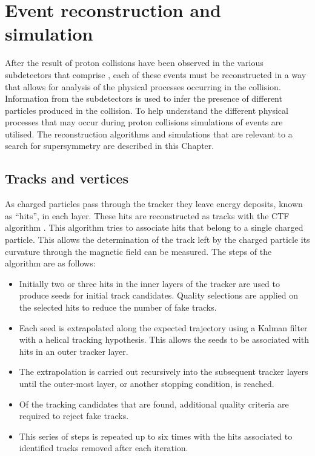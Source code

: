 \chapter{Event reconstruction and simulation}
\label{chap:reconstruction}

After the result of proton collisions have been observed in the
various subdetectors that comprise \CMS, each of these events must be
reconstructed in a way that allows for analysis of the physical
processes occurring in the collision. Information from the
subdetectors is used to infer the presence of different particles
produced in the collision. To help understand the different physical
processes that may occur during \LHC proton collisions \MC simulations
of events are utilised. The reconstruction algorithms and simulations
that are relevant to a search for supersymmetry are described in this
Chapter.

\section{Tracks and vertices}
\label{sec:tracks_reco}

As charged particles pass through the \CMS tracker they leave energy
deposits, known as ``hits'', in each layer. These
hits are reconstructed as tracks with the \ac{CTF}
algorithm \cite{Chatrchyan:2014fea}. This algorithm tries to associate
hits that belong to a single charged particle. This allows the
determination of the track left by the charged particle its curvature
through the magnetic field can be measured. The steps of the algorithm
are as follows:

\begin{itemize}
\item{Initially two or three hits in the inner layers of the tracker
are used to produce seeds for initial track candidates. Quality
selections are applied on the selected hits to reduce the number of fake tracks.} 
\item{Each seed is extrapolated along the expected trajectory using a
Kalman filter \cite{Fruhwirth:1987fm} with a helical tracking
hypothesis.  This allows the seeds to be associated with hits in an
outer tracker layer.} 
\item{The extrapolation is carried out recursively into the subsequent
tracker layers until the outer-most layer, or another
stopping condition, is reached.} 
\item{Of the tracking candidates that are found, additional quality
criteria are required to reject fake tracks.}
\item{This series of steps is repeated up to six times with the hits
associated to identified tracks removed after each iteration. }
\end{itemize}


